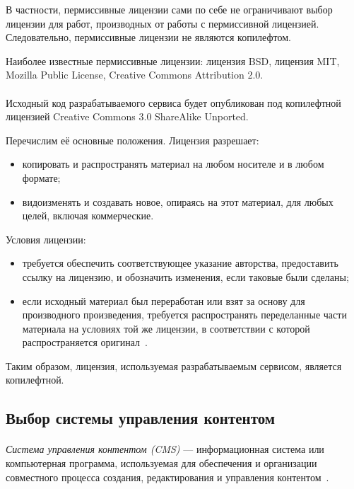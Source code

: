 В частности, пермиссивные лицензии сами по себе не ограничивают выбор лицензии для работ,
производных от работы с пермиссивной лицензией. Следовательно, пермиссивные лицензии не являются копилефтом.

Наиболее известные пермиссивные лицензии: лицензия BSD, лицензия MIT, Mozilla Public License, Creative Commons Attribution 2.0.

\paragraph{}
Исходный код разрабатываемого сервиса будет опубликован под копилефтной лицензией 
Creative Commons 3.0 ShareAlike Unported.

Перечислим её основные положения. Лицензия разрешает:
\begin{itemize}
\item копировать и распространять материал на любом носителе и в любом формате;
\item видоизменять и создавать новое, опираясь на этот материал, для любых целей, включая коммерческие.
\end{itemize}

Условия лицензии:
\begin{itemize}
\item требуется обеспечить соответствующее указание авторства, предоставить ссылку на лицензию,
  и обозначить изменения, если таковые были сделаны;
\item если исходный материал был переработан или взят за основу для производного произведения,
  требуется распространять переделанные части материала на условиях той же лицензии, 
  в соответствии с которой распространяется оригинал~\cite{cc_by_sa}.
\end{itemize}

Таким образом, лицензия, используемая разрабатываемым сервисом, является копилефтной. 

\subsection{Выбор системы управления контентом}
\label{ssec:choice_cms}

\paragraph{}
\textit{Система управления контентом (CMS)} --- информационная система или компьютерная программа,
используемая для обеспечения и организации совместного процесса создания,
редактирования и управления контентом~\cite{wiki_cms}.

